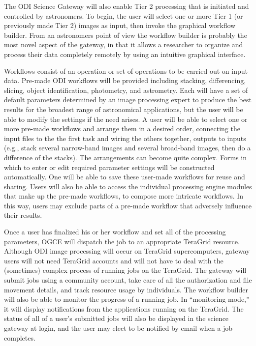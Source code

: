 \documentclass[10pt,conference]{IEEEtran}
\begin{document}
The ODI Science Gateway will also enable Tier 2 processing that is initiated and controlled by astronomers. To begin, the user will select one or more Tier 1 (or previously made Tier 2) images as input, then invoke the graphical workflow builder. From an astronomers point of view the workflow builder is probably the most novel aspect of the gateway, in that it allows a researcher to organize and process their data completely remotely by using an intuitive graphical interface.

Workflows consist of an operation or set of operations to be carried out on input data. Pre-made ODI workflows will be provided including stacking, differencing, slicing, object identification, photometry, and astrometry. Each will have a set of default parameters determined by an image processing expert to produce the best results for the broadest range of astronomical applications, but the user will be able to modify the settings if the need arises. A user will be able to select one or more pre-made workflows and arrange them in a desired order, connecting the input files to the the first task and wiring the others together, outputs to inputs (e.g., stack several narrow-band images and several broad-band images, then do a difference of the stacks). The arrangements can become quite complex. Forms in which to enter or edit required parameter settings will be constructed automatically. One will be able to save these user-made workflows for reuse and sharing.  Users will also be able to access the individual processing engine modules that make up the pre-made workflows, to compose more intricate workflows. In this way, users may exclude parts of a pre-made workflow that adversely influence their results.

Once a user has finalized his or her workflow and set all of the processing parameters, OGCE will dispatch the job to an appropriate TeraGrid resource. Although ODI image processing will occur on TeraGrid supercomputers, gateway users will not need TeraGrid accounts and will not have to deal with the (sometimes) complex process of running jobs on the TeraGrid. The gateway will submit jobs using a community account, take care of all the authorization and file movement details, and track resource usage by individuals. The workflow builder will also be able to monitor the progress of a running job. In ``monitoring mode,'' it will display notifications from the applications running on the TeraGrid. The status of all of a user's submitted jobs will also be displayed in the science gateway at login, and the user may elect to be notified by email when a job completes. 
 
\end{document}
